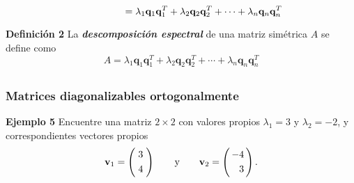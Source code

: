 {\begin{frame}
\begin{itemize}
		\vspace{2mm}
		\[
		\phantom{A = QDQ^T} 
		=		
		\lambda_1\mathbf{q}_1\mathbf{q}_1^T + \lambda_2\mathbf{q}_2\mathbf{q}_2^T + \cdots + \lambda_n\mathbf{q}_n\mathbf{q}_n^T  		
		\hspace{3mm}
		\]	

	\end{itemize}
	
	\begin{defi}{\textbf{Definición 2}}\justifying
		\justifying
		La \textbf{\textit{descomposición espectral}} de una matriz simétrica $A$ se define como
		\[
			A=\lambda_1\mathbf{q}_1\mathbf{q}_1^T + \lambda_2\mathbf{q}_2\mathbf{q}_2^T + \cdots + \lambda_n\mathbf{q}_n\mathbf{q}_n^T
		\]
	\end{defi}	

\end{frame}
}


\subsection{}

\begin{frame}\frametitle{Matrices diagonalizables ortogonalmente}
	
	\begin{ej}{\textbf{Ejemplo 5}} \justifying 
		Encuentre una matriz $2\times 2$ con valores propios $\lambda_1=3$ y $\lambda_2=-2$, y correspondientes vectores propios
		\[
		\mathbf{v}_1 =
		\left(
		\begin{array}{@{\hspace{0.5\tabcolsep}}c@{\hspace{0.5\tabcolsep}}}
		3 \\[1mm]
		4 
		\end{array}
		\right)
		\qquad \text{y} \qquad 
		\mathbf{v}_2  =
		\left(
		\begin{array}{@{\hspace{0.3\tabcolsep}}r@{\hspace{0.3\tabcolsep}}}
		-4 \\[1mm]		
		 3
		\end{array}
		\right).
		\]	
	\end{ej}
	
\end{frame}